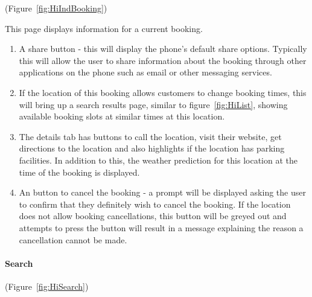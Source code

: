 (Figure~\ref{fig:HiIndBooking})


This page displays information for a current booking.
\begin{enumerate}
	\item A share button - this will display the phone's default share options.
	      Typically this will allow the user to share information about the
	      booking through other applications on the phone such as email or other
	      messaging services.
	\item If the location of this booking allows customers to change booking
	      times, this will bring up a search results page, similar to figure~\ref{fig:HiList},
	      showing available booking slots at similar times at this location.
	\item The details tab has buttons to call the location, visit their website,
	      get directions to the location and also highlights if the location
	      has parking facilities. In addition to this, the weather prediction
	      for this location at the time of the booking is displayed.
	\item An button to cancel the booking - a prompt will be displayed asking
	      the user to confirm that they definitely wish to cancel the booking.
	      If the location does not allow booking cancellations, this button
	      will be greyed out and attempts to press the button will result in
	      a message explaining the reason a cancellation cannot be made.
\end{enumerate}

\paragraph{Search}

(Figure~\ref{fig:HiSearch})


